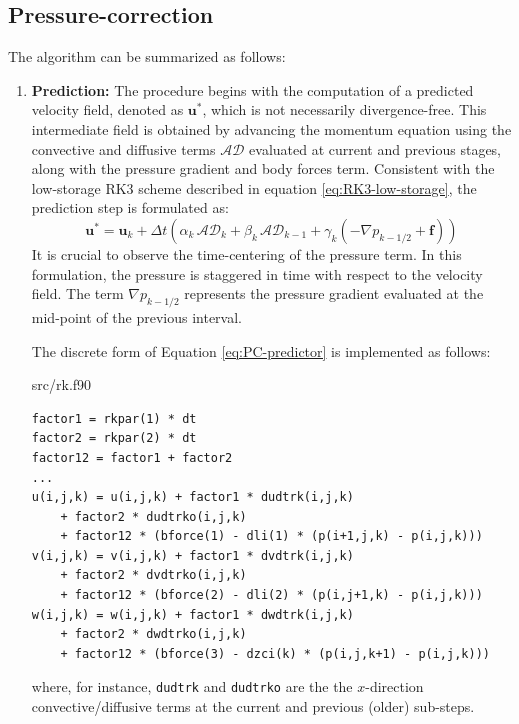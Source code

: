 \documentclass[12pt, a4paper, twoside, openright]{book}
\begin{document}
\subsection{Pressure-correction}
The algorithm can be summarized as follows:
\begin{enumerate}
	\item \textbf{Prediction:} The procedure begins with the computation of a predicted velocity field, denoted as $\bm{u}^*$, which is not necessarily divergence-free. This intermediate field is obtained by advancing the momentum equation using the convective and diffusive terms $\mathcal{AD}$ evaluated at current and previous stages, along with the pressure gradient and body forces term. Consistent with the low-storage RK3 scheme described in equation \eqref{eq:RK3-low-storage}, the prediction step is formulated as:
\begin{equation}
\label{eq:PC-predictor}
\bm{u}^* = \bm{u}_k + \Delta t \left( \alpha_k \, \mathcal{AD}_k + \beta_k \,\mathcal{AD}_{k-1} + \gamma_k \left( -\nabla p_{k-1/2} + \bm{f} \right) \right)
\end{equation}
It is crucial to observe the time-centering of the pressure term. In this formulation, the pressure is staggered in time with respect to the velocity field. The term $\nabla p_{k-1/2}$ represents the pressure gradient evaluated at the mid-point of the previous interval.

The discrete form of Equation \eqref{eq:PC-predictor} is implemented as follows:
\begin{codebox}{src/rk.f90}
\begin{lstlisting}[style=mdfortran]
factor1 = rkpar(1) * dt
factor2 = rkpar(2) * dt
factor12 = factor1 + factor2
...
u(i,j,k) = u(i,j,k) + factor1 * dudtrk(i,j,k) 
	+ factor2 * dudtrko(i,j,k) 
	+ factor12 * (bforce(1) - dli(1) * (p(i+1,j,k) - p(i,j,k)))
v(i,j,k) = v(i,j,k) + factor1 * dvdtrk(i,j,k) 
	+ factor2 * dvdtrko(i,j,k) 
	+ factor12 * (bforce(2) - dli(2) * (p(i,j+1,k) - p(i,j,k)))
w(i,j,k) = w(i,j,k) + factor1 * dwdtrk(i,j,k) 
	+ factor2 * dwdtrko(i,j,k) 
	+ factor12 * (bforce(3) - dzci(k) * (p(i,j,k+1) - p(i,j,k)))
\end{lstlisting}
\end{codebox}
where, for instance, \texttt{dudtrk} and \texttt{dudtrko} are the the $x$-direction convective/diffusive terms at the current and previous (older) sub-steps.


\end{enumerate}
\end{document}
